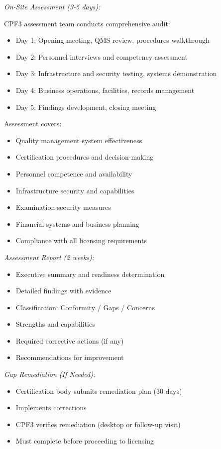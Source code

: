 \documentclass[11pt,a4paper]{article}
\begin{document}
\textit{On-Site Assessment (3-5 days):}

CPF3 assessment team conducts comprehensive audit:

\begin{itemize}
\item Day 1: Opening meeting, QMS review, procedures walkthrough
\item Day 2: Personnel interviews and competency assessment
\item Day 3: Infrastructure and security testing, systems demonstration
\item Day 4: Business operations, facilities, records management
\item Day 5: Findings development, closing meeting
\end{itemize}

Assessment covers:
\begin{itemize}
\item Quality management system effectiveness
\item Certification procedures and decision-making
\item Personnel competence and availability
\item Infrastructure security and capabilities
\item Examination security measures
\item Financial systems and business planning
\item Compliance with all licensing requirements
\end{itemize}

\textit{Assessment Report (2 weeks):}

\begin{itemize}
\item Executive summary and readiness determination
\item Detailed findings with evidence
\item Classification: Conformity / Gaps / Concerns
\item Strengths and capabilities
\item Required corrective actions (if any)
\item Recommendations for improvement
\end{itemize}

\textit{Gap Remediation (If Needed):}

\begin{itemize}
\item Certification body submits remediation plan (30 days)
\item Implements corrections
\item CPF3 verifies remediation (desktop or follow-up visit)
\item Must complete before proceeding to licensing
\end{itemize}
\end{document}
